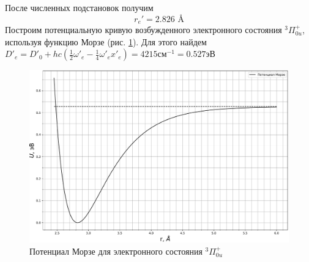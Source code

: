 После численных подстановок получим
\begin{equation}
r_e' = 2.826 \text{ \AA}
\end{equation}
Построим потенциальную кривую возбужденного электронного состояния $^3\Pi^+_{0u}$, используя функцию Морзе (рис. \ref{fig:morse}). Для этого найдем $D'_e = D'_0 + hc(\frac{1}{2}\omega'_e - \frac{1}{4}\omega'_e x'_e) = 4215 \text{см}^{-1} = 0.527 \text{эВ}$
\begin{figure}[h!]
	\centering
	\includegraphics[height=0.45\textheight]{data/morse}
	\caption{Потенциал Морзе для электронного состояния $^3\Pi^+_{0u}$}
	\label{fig:morse}
\end{figure}

